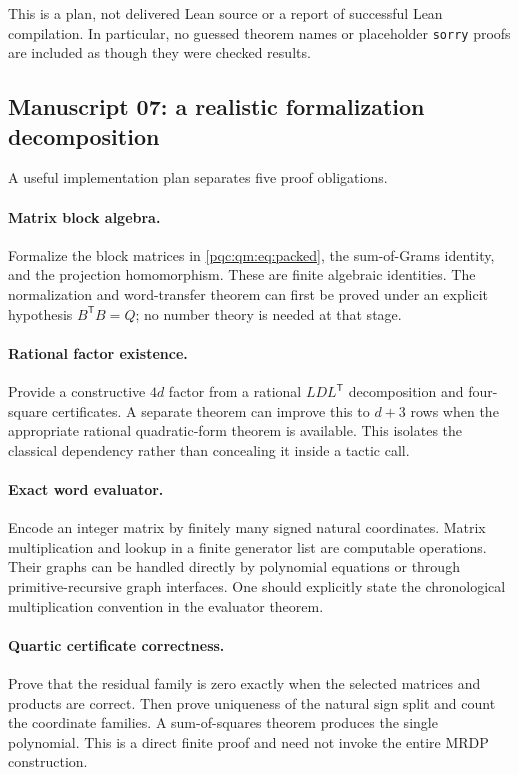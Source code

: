 \documentclass[11pt,letterpaper]{article}
\numberwithin{equation}{section}
\theoremstyle{definition}
\theoremstyle{remark}
\newcommand{\code}[1]{\nolinkurl{#1}}
\begin{document}
This is a plan, not delivered Lean source or a report of successful Lean
compilation. In particular, no guessed theorem names or placeholder
\code{sorry} proofs are included as though they were checked results.

\subsection{Manuscript 07: a realistic formalization decomposition}
A useful implementation plan separates five proof obligations.

\paragraph{Matrix block algebra.}
Formalize the block matrices in \eqref{pqc:qm:eq:packed}, the sum-of-Grams identity, and the projection homomorphism. These are finite algebraic identities. The normalization and word-transfer theorem can first be proved under an explicit hypothesis $B^{\mathsf T}B=Q$; no number theory is needed at that stage.

\paragraph{Rational factor existence.}
Provide a constructive $4d$ factor from a rational $LDL^{\mathsf T}$ decomposition and four-square certificates. A separate theorem can improve this to $d+3$ rows when the appropriate rational quadratic-form theorem is available. This isolates the classical dependency rather than concealing it inside a tactic call.

\paragraph{Exact word evaluator.}
Encode an integer matrix by finitely many signed natural coordinates. Matrix multiplication and lookup in a finite generator list are computable operations. Their graphs can be handled directly by polynomial equations or through primitive-recursive graph interfaces. One should explicitly state the chronological multiplication convention in the evaluator theorem.

\paragraph{Quartic certificate correctness.}
Prove that the residual family is zero exactly when the selected matrices and products are correct. Then prove uniqueness of the natural sign split and count the coordinate families. A sum-of-squares theorem produces the single polynomial. This is a direct finite proof and need not invoke the entire MRDP construction.
\end{document}
